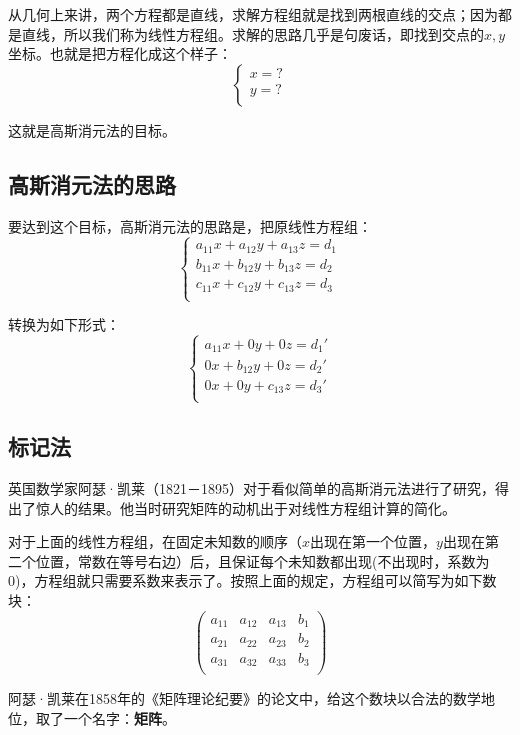 \documentclass[12pt]{article}
\begin{document}
从几何上来讲，两个方程都是直线，求解方程组就是找到两根直线的交点；因为都是直线，所以我们称为线性方程组。求解的思路几乎是句废话，即找到交点的$x,y$坐标。也就是把方程化成这个样子：
$$
\begin{cases}
x = ?\\
y = ?\\
\end{cases}
$$

这就是高斯消元法的目标。
\subsection{高斯消元法的思路\cite{From_Gauss_Elimination_To_Matrix_Multiplication}}
要达到这个目标，高斯消元法的思路是，把原线性方程组：
$$
\begin{cases}
a_{11}x + a_{12}y + a_{13}z = d_1 \\
b_{11}x + b_{12}y + b_{13}z = d_2 \\
c_{11}x + c_{12}y + c_{13}z = d_3 \\
\end{cases}
$$

转换为如下形式：
$$
\begin{cases}
a_{11}x + 0y + 0z = d_1' \\
0x + b_{12}y + 0z = d_2' \\
0x + 0y + c_{13}z = d_3' \\
\end{cases}
$$

\subsection{标记法}
英国数学家阿瑟·凯莱（1821－1895）对于看似简单的高斯消元法进行了研究，得出了惊人的结果。他当时研究矩阵的动机出于对线性方程组计算的简化。

对于上面的线性方程组，在固定未知数的顺序（$x$出现在第一个位置，$y$出现在第二个位置，常数在等号右边）后，且保证每个未知数都出现(不出现时，系数为0)，方程组就只需要系数来表示了。按照上面的规定，方程组可以简写为如下数块：
$$
\begin{pmatrix}
a_{11} & a_{12} & a_{13} & b_{1} \\
a_{21} & a_{22} & a_{23} & b_{2} \\
a_{31} & a_{32} & a_{33} & b_{3} \\
\end{pmatrix}
$$

阿瑟·凯莱在1858年的《矩阵理论纪要》的论文中，给这个数块以合法的数学地位，取了一个名字：\textbf{矩阵}。
\end{document}
